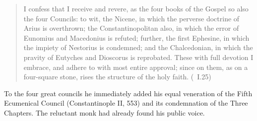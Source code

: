 \begin{quote}
I confess that I receive and revere, as the four books of the Gospel so also
the four Councils: to wit, the Nicene, in which the perverse doctrine of Arius
is overthrown; the Constantinopolitan also, in which the error of Eunomius and
Macedonius is refuted; further, the first Ephesine, in which the impiety of
Nestorius is condemned; and the Chalcedonian, in which the pravity of Eutyches
and Dioscorus is reprobated. These with full devotion I embrace, and adhere to
with most entire approval; since on them, as on a four-square stone, rises the
structure of the holy faith. (\ I.25)
\end{quote}

To the four great councils he immediately added his equal veneration of the
Fifth Ecumenical Council (Constantinople II, 553) and its condemnation of the
Three Chapters. The reluctant monk had already found his public voice.
